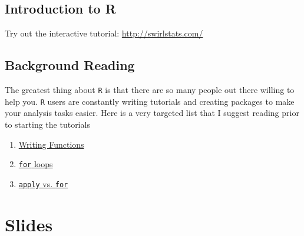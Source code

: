 \documentclass[]{book}
\providecommand{\tightlist}{%
  \setlength{\itemsep}{0pt}\setlength{\parskip}{0pt}}
\theoremstyle{definition}
\theoremstyle{definition}
\theoremstyle{definition}
\theoremstyle{remark}
\begin{document}
\section*{Introduction to R}\label{introduction-to-r}

Try out the interactive tutorial: \url{http://swirlstats.com/}

\section*{Background Reading}\label{background-reading}

The greatest thing about \texttt{R} is that there are so many people out
there willing to help you. \texttt{R} users are constantly writing
tutorials and creating packages to make your analysis tasks easier. Here
is a very targeted list that I suggest reading prior to starting the
tutorials

\begin{enumerate}
\def\labelenumi{\arabic{enumi}.}
\tightlist
\item
  \href{http://r4ds.had.co.nz/functions.html}{Writing Functions}
\item
  \href{http://r4ds.had.co.nz/iteration.html}{\texttt{for} loops}
\item
  \href{https://kbroman.wordpress.com/2013/04/02/apply-vs-for/}{\texttt{apply}
  vs. \texttt{for}}
\end{enumerate}

\chapter*{Slides}\label{slides}
\end{document}
